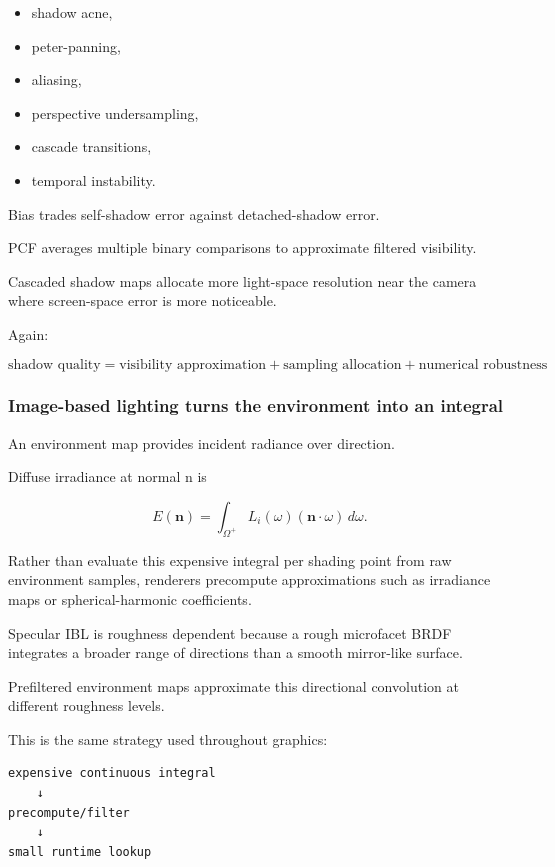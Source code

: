 \begin{itemize}
\tightlist
\item
  shadow acne,
\item
  peter-panning,
\item
  aliasing,
\item
  perspective undersampling,
\item
  cascade transitions,
\item
  temporal instability.
\end{itemize}

Bias trades self-shadow error against detached-shadow error.

PCF averages multiple binary comparisons to approximate filtered visibility.

Cascaded shadow maps allocate more light-space resolution near the camera where screen-space error is more noticeable.

Again:

\[
\boxed{
\text{shadow quality}
=
\text{visibility approximation}
+
\text{sampling allocation}
+
\text{numerical robustness}
}
\]

\subsubsection{Image-based lighting turns the environment into an integral}\label{03-visual-computing-i-ch001-image-based-lighting-turns-the-environment-into-an-integral}

An environment map provides incident radiance over direction.

Diffuse irradiance at normal n is

\[
E(\mathbf n)
=
\int_{\Omega^+}
L_i(\omega)
(\mathbf n\cdot\omega)
\,d\omega.
\]

Rather than evaluate this expensive integral per shading point from raw environment samples, renderers precompute approximations such as irradiance maps or spherical-harmonic coefficients.

Specular IBL is roughness dependent because a rough microfacet BRDF integrates a broader range of directions than a smooth mirror-like surface.

Prefiltered environment maps approximate this directional convolution at different roughness levels.

This is the same strategy used throughout graphics:

\begin{verbatim}
expensive continuous integral
    ↓
precompute/filter
    ↓
small runtime lookup
\end{verbatim}

